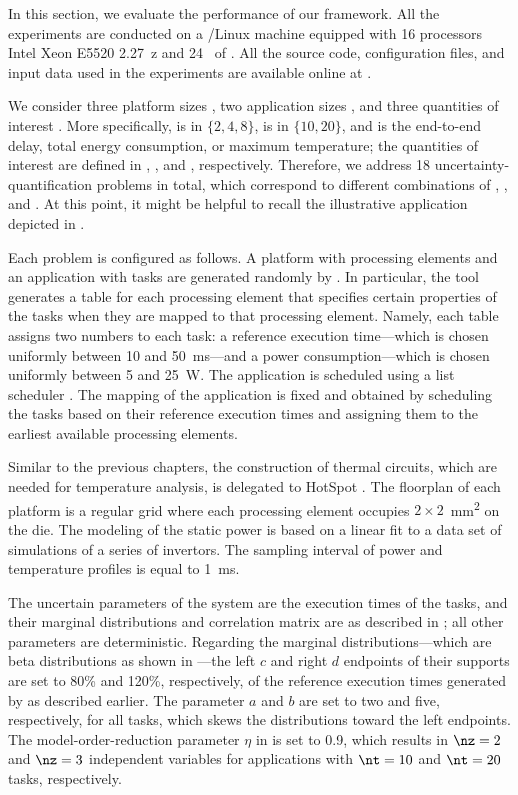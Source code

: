 In this section, we evaluate the performance of our framework. All the
experiments are conducted on a /Linux machine equipped with 16
processors Intel Xeon E5520 2.27~z and 24~ of . All the
source code, configuration files, and input data used in the experiments are
available online at \cite{eslab2017a}.

We consider three platform sizes \np, two application sizes \nt, and three
quantities of interest \g. More specifically, \np is in $\{ 2, 4, 8 \}$, \nt is
in $\{ 10, 20 \}$, and \g is the end-to-end delay, total energy consumption, or
maximum temperature; the quantities of interest are defined in
, , and
, respectively. Therefore, we address 18
uncertainty-quantification problems in total, which correspond to different
combinations of \np, \nt, and \g. At this point, it might be helpful to recall
the illustrative application depicted in .

Each problem is configured as follows. A platform with \np processing elements
and an application with \nt tasks are generated randomly by 
\cite{dick1998}. In particular, the tool generates a table for each processing
element that specifies certain properties of the tasks when they are mapped to
that processing element. Namely, each table assigns two numbers to each task: a
reference execution time---which is chosen uniformly between 10 and 50~ms---and
a power consumption---which is chosen uniformly between 5 and 25~W. The
application is scheduled using a list scheduler \cite{adam1974}. The mapping of
the application is fixed and obtained by scheduling the tasks based on their
reference execution times and assigning them to the earliest available
processing elements.

Similar to the previous chapters, the construction of thermal  circuits,
which are needed for temperature analysis, is delegated to HotSpot
\cite{skadron2003}. The floorplan of each platform is a regular grid where each
processing element occupies $2 \times 2$~mm\textsuperscript{2} on the die. The
modeling of the static power is based on a linear fit to a data set of
 simulations of a series of  invertors. The sampling interval
of power and temperature profiles is equal to 1~ms.

The uncertain parameters \vu of the system are the execution times of the tasks,
and their marginal distributions and correlation matrix are as described in
; all other parameters are deterministic.
Regarding the marginal distributions---which are beta distributions as shown in
---the left $c$ and right $d$ endpoints of their
supports are set to 80\% and 120\%, respectively, of the reference execution
times generated by  as described earlier. The parameter $a$ and $b$ are
set to two and five, respectively, for all tasks, which skews the distributions
toward the left endpoints. The model-order-reduction parameter $\eta$ in
 is set to 0.9, which results in $\nz = 2$ and $\nz
= 3$ independent variables for applications with $\nt = 10$ and $\nt = 20$
tasks, respectively.

